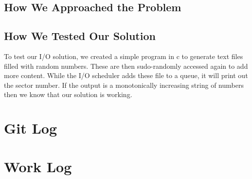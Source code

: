 \documentclass[10pt,onecolumn,journal,draftclsnofoot,letterpaper]{IEEEtran}
\begin{document}
\subsection{How We Approached the Problem}

\subsection{How We Tested Our Solution}
    To test our I/O solution, we created a simple program in c to generate text files filled with random numbers. These are then sudo-randomly accessed again to add more content. While the I/O scheduler adds these file to a queue, it will print out the sector number. If the output is a monotonically increasing string of numbers then we know that our solution is working.

\section{Git Log}

\section{Work Log}
\end{document}
